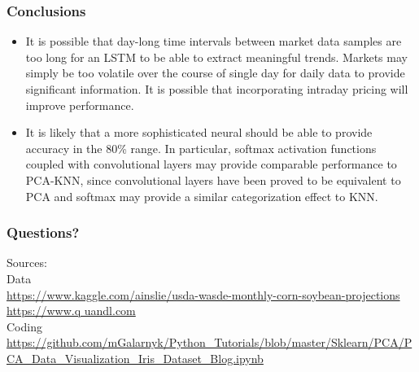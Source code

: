 \documentclass{beamer}
\begin{document}
\begin{frame}
\frametitle{Conclusions}
\begin{itemize}

\item It is possible that day-long time intervals between market data samples are too long for an LSTM to be able to extract meaningful trends.  Markets may simply be too volatile over the course of single day for daily data to provide significant information.  It is possible that incorporating intraday pricing will improve performance.

\item It is likely that a more sophisticated neural should be able to provide accuracy in the 80\% range.  In particular, softmax activation functions coupled with convolutional layers may provide comparable performance to PCA-KNN, since convolutional layers have been proved to be equivalent to PCA and softmax may provide a similar categorization effect to KNN.

\end{itemize}
\end{frame}


\begin{frame}
\frametitle{Questions?}
Sources:
\vspace{.1in}
\\Data 
\\\url{https://www.kaggle.com/ainslie/usda-wasde-monthly-corn-soybean-projections}
\\\url{https://www.q uandl.com}
\vspace{.1in}
\\Coding
\\\url{https://github.com/mGalarnyk/Python_Tutorials/blob/master/Sklearn/PCA/PCA_Data_Visualization_Iris_Dataset_Blog.ipynb}
\end{frame}
\end{document}
